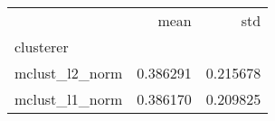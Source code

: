 \begin{tabular}{lrr}
\toprule
{} &      mean &       std \\
clusterer      &           &           \\
\midrule
mclust\_l2\_norm &  0.386291 &  0.215678 \\
mclust\_l1\_norm &  0.386170 &  0.209825 \\
\bottomrule
\end{tabular}


